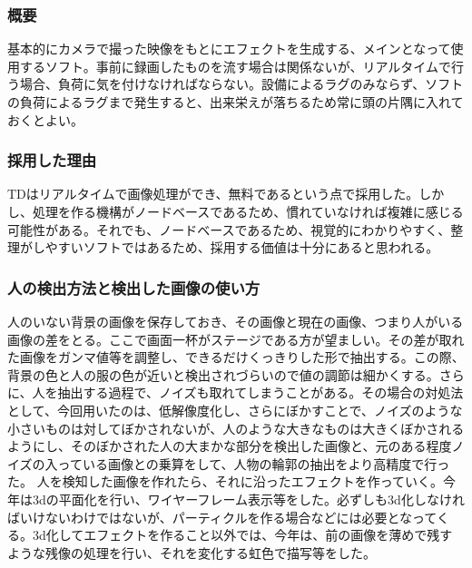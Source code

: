\documentclass[a4paper]{ltjsreport}
\begin{document}
\subsubsection{概要}
基本的にカメラで撮った映像をもとにエフェクトを生成する、メインとなって使用するソフト。事前に録画したものを流す場合は関係ないが、リアルタイムで行う場合、負荷に気を付けなければならない。設備によるラグのみならず、ソフトの負荷によるラグまで発生すると、出来栄えが落ちるため常に頭の片隅に入れておくとよい。

\subsubsection{採用した理由}
TDはリアルタイムで画像処理ができ、無料であるという点で採用した。しかし、処理を作る機構がノードベースであるため、慣れていなければ複雑に感じる可能性がある。それでも、ノードベースであるため、視覚的にわかりやすく、整理がしやすいソフトではあるため、採用する価値は十分にあると思われる。

\subsubsection{人の検出方法と検出した画像の使い方}
人のいない背景の画像を保存しておき、その画像と現在の画像、つまり人がいる画像の差をとる。ここで画面一杯がステージである方が望ましい。その差が取れた画像をガンマ値等を調整し、できるだけくっきりした形で抽出する。この際、背景の色と人の服の色が近いと検出されづらいので値の調節は細かくする。さらに、人を抽出する過程で、ノイズも取れてしまうことがある。その場合の対処法として、今回用いたのは、低解像度化し、さらにぼかすことで、ノイズのような小さいものは対してぼかされないが、人のような大きなものは大きくぼかされるようにし、そのぼかされた人の大まかな部分を検出した画像と、元のある程度ノイズの入っている画像との乗算をして、人物の輪郭の抽出をより高精度で行った。
人を検知した画像を作れたら、それに沿ったエフェクトを作っていく。今年は3dの平面化を行い、ワイヤーフレーム表示等をした。必ずしも3d化しなければいけないわけではないが、パーティクルを作る場合などには必要となってくる。3d化してエフェクトを作ること以外では、今年は、前の画像を薄めで残すような残像の処理を行い、それを変化する虹色で描写等をした。
\end{document}
